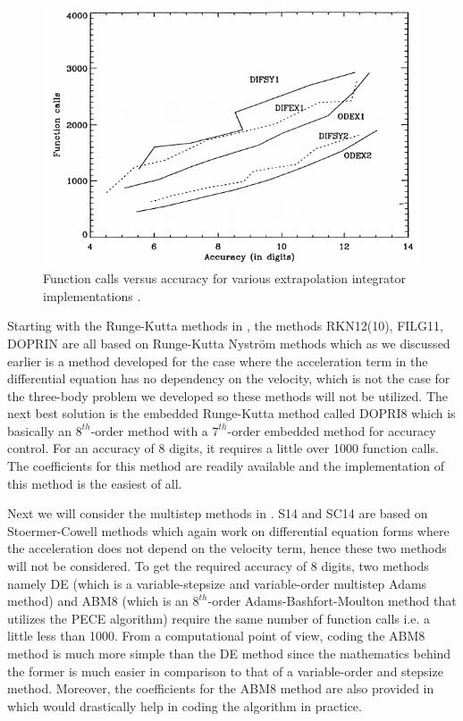 \FloatBarrier
%
%
\begin{figure}[h]
\centering
\captionsetup{justification=centering}
\includegraphics[scale=0.7]{exc.png}
\caption{Function calls versus accuracy for various extrapolation integrator implementations \cite{integ_comp}.}
\label{fig:exc}
\end{figure}
\FloatBarrier
%
Starting with the Runge-Kutta methods in , the methods RKN12(10), FILG11, DOPRIN are all based on Runge-Kutta Nystr\"om methods which as we discussed earlier is a method developed for the case where the acceleration term in the differential equation has no dependency on the velocity, which is not the case for the three-body problem we developed so these methods will not be utilized. The next best solution is the embedded Runge-Kutta method called DOPRI8 which is basically an $8^{th}$-order method with a $7^{th}$-order embedded method for accuracy control. For an accuracy of 8 digits, it requires a little over 1000 function calls. The coefficients for this method are readily available and the implementation of this method is the easiest of all.

Next we will consider the multistep methods in . S14 and SC14 are based on Stoermer-Cowell methods which again work on differential equation forms where the acceleration does not depend on the velocity term, hence these two methods will not be considered. To get the required accuracy of 8 digits, two methods namely DE (which is a variable-stepsize and variable-order multistep Adams method) and ABM8 (which is an $8^{th}$-order Adams-Bashfort-Moulton method that utilizes the \gls{PECE} algorithm) require the same number of function calls i.e. a little less than 1000. From a computational point of view, coding the ABM8 method is much more simple than the DE method since the mathematics behind the former is much easier in comparison to that of a variable-order and stepsize method. Moreover, the coefficients for the ABM8 method are also provided in \cite{gillbook} which would drastically help in coding the algorithm in practice.

